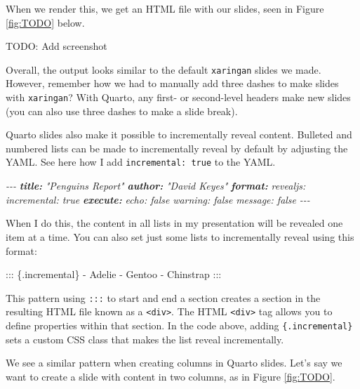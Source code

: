 \documentclass[
]{book}
\newenvironment{Shaded}{\begin{snugshade}}{\end{snugshade}}
\newcommand{\AnnotationTok}[1]{\textcolor[rgb]{0.56,0.35,0.01}{\textbf{\textit{#1}}}}
\newcommand{\CommentTok}[1]{\textcolor[rgb]{0.56,0.35,0.01}{\textit{#1}}}
\newcommand{\NormalTok}[1]{#1}
\newcommand{\SpecialStringTok}[1]{\textcolor[rgb]{0.31,0.60,0.02}{#1}}
\begin{document}
When we render this, we get an HTML file with our slides, seen in Figure \ref{fig:TODO} below.

TODO: Add screenshot

Overall, the output looks similar to the default \texttt{xaringan} slides we made. However, remember how we had to manually add three dashes to make slides with \texttt{xaringan}? With Quarto, any first- or second-level headers make new slides (you can also use three dashes to make a slide break).

Quarto slides also make it possible to incrementally reveal content. Bulleted and numbered lists can be made to incrementally reveal by default by adjusting the YAML. See here how I add \texttt{incremental:\ true} to the YAML.

\begin{Shaded}
\begin{Highlighting}[]
\CommentTok{{-}{-}{-}}
\AnnotationTok{title:}\CommentTok{ "Penguins Report"}
\AnnotationTok{author:}\CommentTok{ "David Keyes"}
\AnnotationTok{format:}\CommentTok{ }
\CommentTok{  revealjs:}
\CommentTok{      incremental: true}
\AnnotationTok{execute:}\CommentTok{ }
\CommentTok{  echo: false}
\CommentTok{  warning: false}
\CommentTok{  message: false}
\CommentTok{{-}{-}{-}}
\end{Highlighting}
\end{Shaded}

When I do this, the content in all lists in my presentation will be revealed one item at a time. You can also set just some lists to incrementally reveal using this format:

\begin{Shaded}
\begin{Highlighting}[]
\NormalTok{::: \{.incremental\}}
\SpecialStringTok{{-} }\NormalTok{Adelie}
\SpecialStringTok{{-} }\NormalTok{Gentoo}
\SpecialStringTok{{-} }\NormalTok{Chinstrap}
\NormalTok{:::}
\end{Highlighting}
\end{Shaded}

This pattern using \texttt{:::} to start and end a section creates a section in the resulting HTML file known as a \texttt{\textless{}div\textgreater{}}. The HTML \texttt{\textless{}div\textgreater{}} tag allows you to define properties within that section. In the code above, adding \texttt{\{.incremental\}} sets a custom CSS class that makes the list reveal incrementally.

We see a similar pattern when creating columns in Quarto slides. Let's say we want to create a slide with content in two columns, as in Figure \ref{fig:TODO}.
\end{document}
